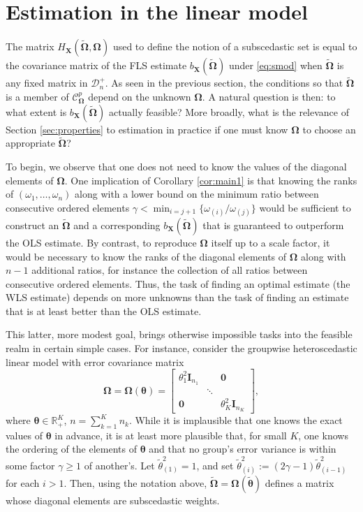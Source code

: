 \documentclass[12pt]{article}
\newcommand{\bl}[1]{{\mathbf #1}}
\newcommand{\bs}[1]{\boldsymbol #1}
\begin{document}
\section{Estimation in the linear model}\label{sec:impl}

The matrix $H_{\bl{X}}(\tilde{\bs{\Omega}}, \bs{\Omega})$ used to define the notion of a subscedastic set is equal to the covariance matrix of the FLS estimate $b_{\bl{X}}(\tilde{\bs{\Omega}})$ under \eqref{eq:smod} when $\tilde{\bs{\Omega}}$ is any fixed matrix in $\mathcal{D}_n^+$. As seen in the previous section, the conditions so that $\tilde{\bs{\Omega}}$ is a member of $\mathcal{C}^p_{\bs{\Omega}}$ depend on the unknown $\bs{\Omega}$. A natural question is then: to what extent is $b_{\bl{X}}(\tilde{\bs{\Omega}})$ actually feasible? More broadly, what is the relevance of Section \ref{sec:properties} to estimation in practice if one must know $\bs{\Omega}$ to choose an appropriate $\tilde{\bs{\Omega}}$?

To begin, we observe that one does not need to know the values of the diagonal elements of $\bs{\Omega}$. One implication of Corollary \ref{cor:main1} is that knowing the ranks of $(\omega_1, \dots, \omega_n)$ along with a lower bound on the minimum ratio between consecutive ordered elements $\gamma < \min_{i = j+1}\{\omega_{(i)}/\omega_{(j)}\}$ would be sufficient to construct an $\tilde{\bs{\Omega}}$ and a corresponding $b_{\bl{X}}(\tilde{\bs{\Omega}})$ that is guaranteed to outperform the OLS estimate. By contrast, to reproduce $\bs{\Omega}$ itself up to a scale factor, it would be necessary to know the ranks of the diagonal elements of $\bs{\Omega}$ along with $n-1$ additional ratios, for instance the collection of all ratios between consecutive ordered elements. Thus, the task of finding an optimal estimate (the WLS estimate) depends on more unknowns than the task of finding an estimate that is at least better than the OLS estimate.

This latter, more modest goal, brings otherwise impossible tasks into the feasible realm in certain simple cases. For instance, consider the groupwise heteroscedastic linear model with error covariance matrix
\begin{equation*}
    \bs{\Omega} = \bs{\Omega}(\bs{\theta}) = \left[ \begin{array}{ccc}
         \theta_1^2 \bl{I}_{n_1} & & \bl 0 \\
         & \ddots & \\
         \bl 0 & & \theta_K^2 \bl{I}_{n_K}
    \end{array}\right],
\end{equation*}
where $\bs{\theta} \in \mathbb{R}_+^K$, $n = \sum_{k=1}^K n_k$. While it is implausible that one knows the exact values of $\bs{\theta}$ in advance, it is at least more plausible that, for small $K$, one knows the ordering of the elements of $\bs{\theta}$ and that no group's error variance is within some factor $\gamma \geq 1$ of another's. Let $\tilde{\theta}_{(1)}^2 = 1$, and set $\tilde{\theta}_{(i)}^2 := (2\gamma - 1)\tilde{\theta}_{(i-1)}^2$ for each $i > 1$. Then, using the notation above, $\tilde{\bs{\Omega}} = \bs{\Omega}(\tilde{\bs{\theta}})$ defines a matrix whose diagonal elements are subscedastic weights.
\end{document}
